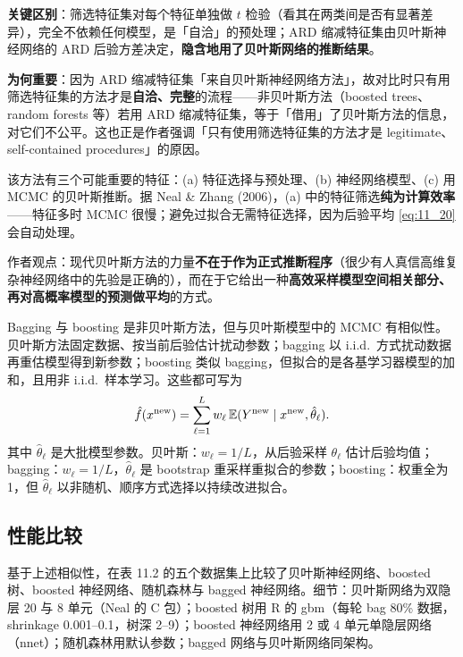 \textbf{关键区别}：筛选特征集对每个特征单独做 $t$ 检验（看其在两类间是否有显著差异），完全不依赖任何模型，是「自洽」的预处理；ARD 缩减特征集由贝叶斯神经网络的 ARD 后验方差决定，\textbf{隐含地用了贝叶斯网络的推断结果}。

\textbf{为何重要}：因为 ARD 缩减特征集「来自贝叶斯神经网络方法」，故对比时只有用筛选特征集的方法才是\textbf{自洽、完整}的流程——非贝叶斯方法（boosted trees、random forests 等）若用 ARD 缩减特征集，等于「借用」了贝叶斯方法的信息，对它们不公平。这也正是作者强调「只有使用筛选特征集的方法才是 legitimate、self-contained procedures」的原因。

\begin{remark}[成功要素与贝叶斯的真正力量]
该方法有三个可能重要的特征：(a) 特征选择与预处理、(b) 神经网络模型、(c) 用 MCMC 的贝叶斯推断。据 Neal \& Zhang (2006)，(a) 中的特征筛选\textbf{纯为计算效率}——特征多时 MCMC 很慢；避免过拟合无需特征选择，因为后验平均 \ref{eq:11_20} 会自动处理。

作者观点：现代贝叶斯方法的力量\textbf{不在于作为正式推断程序}（很少有人真信高维复杂神经网络中的先验是正确的），而在于它给出一种\textbf{高效采样模型空间相关部分、再对高概率模型的预测做平均}的方式。

Bagging 与 boosting 是非贝叶斯方法，但与贝叶斯模型中的 MCMC 有相似性。贝叶斯方法固定数据、按当前后验估计扰动参数；bagging 以 i.i.d.\ 方式扰动数据再重估模型得到新参数；boosting 类似 bagging，但拟合的是各基学习器模型的加和，且用非 i.i.d.\ 样本学习。这些都可写为
\begin{equation}
\hat{f}(x^{\mathrm{new}}) = \sum_{\ell=1}^{L} w_\ell\, \mathbb{E}(Y^{\mathrm{new}}\mid x^{\mathrm{new}}, \hat{\theta}_\ell). \label{eq:11_21}
\end{equation}
其中 $\hat{\theta}_\ell$ 是大批模型参数。贝叶斯：$w_\ell = 1/L$，从后验采样 $\theta_\ell$ 估计后验均值；bagging：$w_\ell = 1/L$，$\hat{\theta}_\ell$ 是 bootstrap 重采样重拟合的参数；boosting：权重全为 1，但 $\hat{\theta}_\ell$ 以非随机、顺序方式选择以持续改进拟合。
\end{remark}

\subsection{性能比较}

基于上述相似性，在表 11.2 的五个数据集上比较了贝叶斯神经网络、boosted 树、boosted 神经网络、随机森林与 bagged 神经网络。细节：贝叶斯网络为双隐层 20 与 8 单元（Neal 的 C 包）；boosted 树用 R 的 gbm（每轮 bag 80\% 数据，shrinkage 0.001--0.1，树深 2--9）；boosted 神经网络用 2 或 4 单元单隐层网络（nnet）；随机森林用默认参数；bagged 网络与贝叶斯网络同架构。

